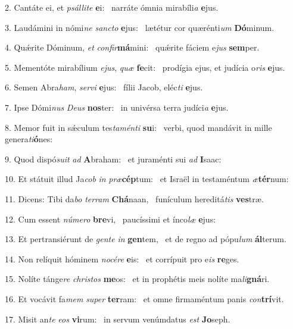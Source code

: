 2. Cantáte ei, et \textit{psál}\textit{li}\textit{te} \textbf{e}i: \ast\  narráte ómnia mirabíli\textit{a} \textbf{e}jus.\

3. Laudámini in nómi\textit{ne} \textit{sanc}\textit{to} \textbf{e}jus: \ast\  lætétur cor quærénti\textit{um} \textbf{Dó}minum.\

4. Quǽrite Dóminum, \textit{et} \textit{con}\textit{fir}\textbf{má}mini: \ast\  quǽrite fáciem e\textit{jus} \textbf{sem}per.\

5. Mementóte mirabílium \textit{e}\textit{jus}, \textit{quæ} \textbf{fe}cit: \ast\  prodígia ejus, et judícia o\textit{ris} \textbf{e}jus.\

6. Semen Abra\textit{ham}, \textit{ser}\textit{vi} \textbf{e}jus: \ast\  fílii Jacob, eléc\textit{ti} \textbf{e}jus.\

7. Ipse Dómi\textit{nus} \textit{De}\textit{us} \textbf{nos}ter: \ast\  in univérsa terra judíci\textit{a} \textbf{e}jus.\

8. Memor fuit in sǽculum tes\textit{ta}\textit{mén}\textit{ti} \textbf{su}i: \ast\  verbi, quod mandávit in mille genera\textit{ti}\textbf{ó}nes:\

9. Quod dispó\textit{su}\textit{it} \textit{ad} \textbf{A}braham: \ast\  et juraménti sui \textit{ad} \textbf{I}saac:\

10. Et státuit illud Ja\textit{cob} \textit{in} \textit{præ}\textbf{cép}tum: \ast\  et Israël in testaméntum \textit{æ}\textbf{tér}num:\

11. Dicens: Tibi da\textit{bo} \textit{ter}\textit{ram} \textbf{Chá}naan, \ast\  funículum hereditá\textit{tis} \textbf{ves}træ.\

12. Cum essent \textit{nú}\textit{me}\textit{ro} \textbf{bre}vi, \ast\  paucíssimi et ínco\textit{læ} \textbf{e}jus:\

13. Et pertransiérunt de \textit{gen}\textit{te} \textit{in} \textbf{gen}tem, \ast\  et de regno ad pópu\textit{lum} \textbf{ál}terum.\

14. Non relíquit hóminem \textit{no}\textit{cé}\textit{re} \textbf{e}is: \ast\  et corrípuit pro e\textit{is} \textbf{re}ges.\

15. Nolíte tánge\textit{re} \textit{chris}\textit{tos} \textbf{me}os: \ast\  et in prophétis meis nolíte ma\textit{li}\textbf{gná}ri.\

16. Et vocávit fa\textit{mem} \textit{su}\textit{per} \textbf{ter}ram: \ast\  et omne firmaméntum panis \textit{con}\textbf{trí}vit.\

17. Misit an\textit{te} \textit{e}\textit{os} \textbf{vi}rum: \ast\  in servum venúmdatus \textit{est} \textbf{Jo}seph.\

